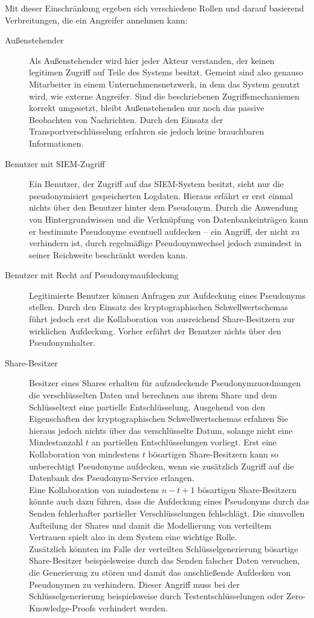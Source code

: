 Mit dieser Einschränkung ergeben sich verschiedene Rollen und darauf basierend Verbreitungen, die ein Angreifer annehmen kann:

\begin{description}
  \item[Außenstehender] Als Außenstehender wird hier jeder Akteur verstanden, der keinen legitimen Zugriff auf Teile des Systems besitzt. Gemeint sind also genauso Mitarbeiter in einem Unternehmensnetzwerk, in dem das System genutzt wird, wie externe Angreifer. Sind die beschriebenen Zugriffsmechanismen korrekt umgesetzt, bleibt Außenstehenden nur noch das passive Beobachten von Nachrichten. Durch den Einsatz der Transportverschlüsselung  erfahren sie jedoch keine brauchbaren Informationen.
  
  \item[Benutzer mit SIEM-Zugriff] Ein Benutzer, der Zugriff auf das SIEM-System besitzt, sieht nur die pseudonymisiert gespeicherten Logdaten. Hieraus erfährt er erst einmal nichts über den Benutzer hinter dem Pseudonym. Durch die Anwendung von Hintergrundwissen und die Verknüpfung von Datenbankeinträgen kann er bestimmte Pseudonyme eventuell aufdecken -- ein Angriff, der nicht zu verhindern ist, durch regelmäßige Pseudonymwechsel jedoch zumindest in seiner Reichweite beschränkt werden kann.
  
  \item[Benutzer mit Recht auf Pseudonymaufdeckung] Legitimierte Benutzer können Anfragen zur Aufdeckung eines Pseudonyms stellen. Durch den Einsatz des kryptographischen Schwellwertschemas führt jedoch erst die Kollaboration von ausreichend Share-Besitzern zur wirklichen Aufdeckung. Vorher erfährt der Benutzer nichts über den Pseudonymhalter.
  
  \item[Share-Besitzer] Besitzer eines Shares erhalten für aufzudeckende Pseudonymzuordnungen die verschlüsselten Daten und berechnen aus ihrem Share und dem Schlüsseltext eine partielle Entschlüsselung. Ausgehend von den Eigenschaften des kryptographischen Schwellwertschemas erfahren Sie hieraus jedoch nichts über das verschlüsselte Datum, solange nicht eine Mindestanzahl \(t\) an partiellen Entschlüsselungen vorliegt. Erst eine Kollaboration von mindestens \(t\) bösartigen Share-Besitzern kann so unberechtigt Pseudonyme aufdecken, wenn sie zusätzlich Zugriff auf die Datenbank des Pseudonym-Service erlangen. \\
  Eine Kollaboration von mindestens \(n-t+1\) bösartigen Share-Besitzern könnte auch dazu führen, dass die Aufdeckung eines Pseudonyms durch das Senden fehlerhafter partieller Verschlüsselungen fehlschlägt. Die sinnvollen Aufteilung der Shares und damit die Modellierung von verteiltem Vertrauen spielt also in dem System eine wichtige Rolle.\\
  Zusätzlich könnten im Falle der verteilten Schlüsselgenerierung bösartige Share-Besitzer beispielsweise durch das Senden falscher Daten versuchen, die Generierung zu stören und damit das anschließende Aufdecken von Pseudonymen zu verhindern. Dieser Angriff muss bei der Schlüsselgenerierung beispielsweise durch Testentschlüsselungen oder Zero-Knowledge-Proofs verhindert werden.
  

\end{description}
